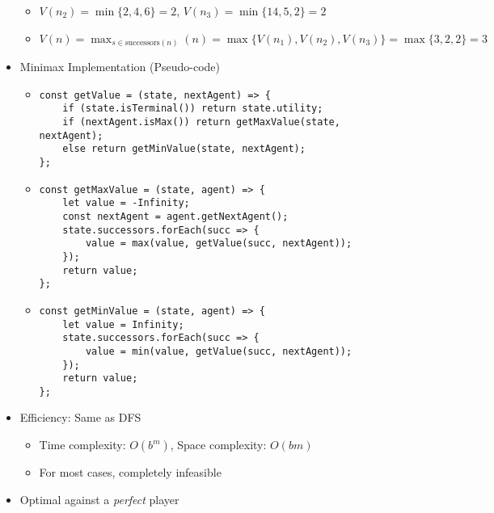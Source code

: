\begin{itemize}
\begin{itemize}
        \item $V(n_2)=\min\{2,4,6\}=2$, $V(n_3)=\min\{14,5,2\}=2$
        \item $V(n)=\max_{s\in\text{successors}(n)}(n)=\max\{V(n_1),V(n_2),V(n_3)\}=\max\{3,2,2\}=3$
    \end{itemize}
    \begin{figures}
    \end{figures}
    \item Minimax Implementation (Pseudo-code)
    \begin{itemize}
        \item {}
        \linespread{1.1}
        \begin{verbatim}
const getValue = (state, nextAgent) => {
    if (state.isTerminal()) return state.utility;
    if (nextAgent.isMax()) return getMaxValue(state, nextAgent);
    else return getMinValue(state, nextAgent);
};
        \end{verbatim}
        \linespread{1.6}
        \item {}
        \linespread{1.1}
        \begin{verbatim}
const getMaxValue = (state, agent) => {
    let value = -Infinity;
    const nextAgent = agent.getNextAgent();
    state.successors.forEach(succ => {
        value = max(value, getValue(succ, nextAgent));
    });
    return value;
};
        \end{verbatim}
        \linespread{1.6}
        \item {}
        \linespread{1.1}
        \begin{verbatim}
const getMinValue = (state, agent) => {
    let value = Infinity;
    state.successors.forEach(succ => {
        value = min(value, getValue(succ, nextAgent));
    });
    return value;
};
        \end{verbatim}
        \linespread{1.6}
    \end{itemize}
    \item Efficiency: Same as DFS
    \begin{itemize}
        \item Time complexity: $O(b^m)$, Space complexity: $O(bm)$
        \item For most cases, completely infeasible
    \end{itemize}
    \item Optimal against a \textit{perfect} player
\end{itemize}

